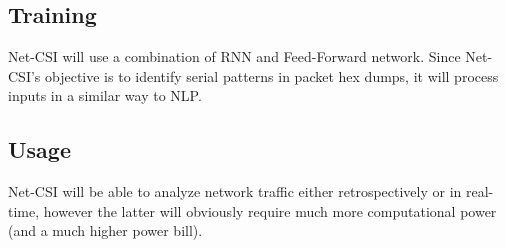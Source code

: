 \documentclass{article}
\begin{document}
\subsection*{Training}
Net-CSI will use a combination of RNN and Feed-Forward network. Since Net-CSI's objective is to identify serial patterns in packet hex dumps, it will process inputs in a similar way to NLP.

\subsection*{Usage}
Net-CSI will be able to analyze network traffic either retrospectively or in real-time, however the latter will obviously require much more computational power (and a much higher power bill).
\end{document}

